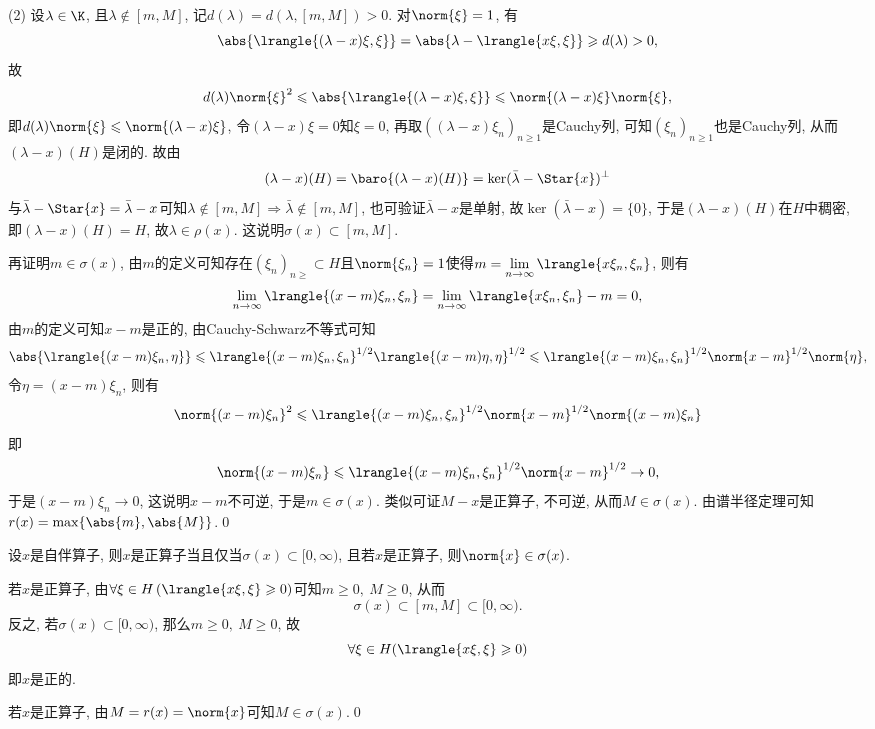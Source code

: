 \begin{Proof}
	(2) 设$ \lambda\in\K $, 且$ \lambda\notin[m,M] $, 记$ d(\lambda)=d(\lambda,[m,M])>0 $. 对$ \norm{\xi}=1 $, 有
	\[
	\abs{\lrangle{(\lambda-x)\xi,\xi}}=\abs{\lambda-\lrangle{x\xi,\xi}}\geqslant d(\lambda)>0,
	\]
	故
	\[
	d(\lambda)\norm{\xi}^2\leqslant\abs{\lrangle{(\lambda-x)\xi,\xi}}\leqslant\norm{(\lambda-x)\xi}\norm{\xi},
	\]
	即$ d(\lambda)\norm{\xi}\leqslant\norm{(\lambda-x)\xi} $, 令$ (\lambda-x)\xi=0 $知$ \xi=0 $, 再取$ ((\lambda-x)\xi_n)_{n\geqslant 1} $是Cauchy列, 可知$ (\xi_n)_{n\geqslant 1} $也是Cauchy列, 从而$ (\lambda-x)(H) $是闭的. 故由
	\[
	(\lambda-x)(H)=\baro{(\lambda-x)(H)}=\ker (\bar{\lambda}-\Star{x})^\bot
	\]
	与$ \bar{\lambda}-\Star{x}=\bar{\lambda}-x $可知$ \lambda\notin[m,M]\Rightarrow\bar{\lambda}\notin[m,M] $, 也可验证$ \bar{\lambda}-x $是单射, 故$ \ker(\bar{\lambda}-x)=\{0\} $, 于是$ (\lambda-x)(H) $在$ H $中稠密, 即$ (\lambda-x)(H)=H $, 故$ \lambda\in\rho(x) $. 这说明$ \sigma(x)\subset[m,M] $.
	
	再证明$ m\in\sigma(x) $, 由$ m $的定义可知存在$ (\xi_n)_{n\geqslant}\subset H $且$ \norm{\xi_n}=1 $使得$ m=\lim\limits_{n\to\infty}\lrangle{x\xi_n,\xi_n} $, 则有
	\[
	\lim_{n\to \infty}\lrangle{(x-m)\xi_n,\xi_n}=\lim_{n\to\infty}\lrangle{x\xi_n,\xi_n}-m=0,
	\]
	由$ m $的定义可知$ x-m $是正的, 由Cauchy-Schwarz不等式可知
	\[
	\abs{\lrangle{(x-m)\xi_n,\eta}}\leqslant\lrangle{(x-m)\xi_n,\xi_n}^{1/2}\lrangle{(x-m)\eta,\eta}^{1/2}\leqslant\lrangle{(x-m)\xi_n,\xi_n}^{1/2}\norm{x-m}^{1/2}\norm{\eta},
	\]
	令$ \eta=(x-m)\xi_n $, 则有
	\[
	\norm{(x-m)\xi_n}^2\leqslant\lrangle{(x-m)\xi_n,\xi_n}^{1/2}\norm{x-m}^{1/2}\norm{(x-m)\xi_n}
	\]
	即
	\[
	\norm{(x-m)\xi_n}\leqslant\lrangle{(x-m)\xi_n,\xi_n}^{1/2}\norm{x-m}^{1/2}\to 0,
	\]
	于是$ (x-m)\xi_n\to 0 $, 这说明$ x-m $不可逆, 于是$ m\in\sigma(x) $. 类似可证$ M-x $是正算子, 不可逆, 从而$ M\in\sigma(x) $. 由谱半径定理可知$ r(x)=\max\{ \abs{m},\abs{M} \} $.\qed
	\end{Proof}
	
	\begin{Corollary}
	设$ x $是自伴算子, 则$ x $是正算子当且仅当$ \sigma(x)\subset[0,\infty) $, 且若$ x $是正算子, 则$ \norm{x}\in\sigma(x) $.
	\end{Corollary}
	\begin{Proof}
	若$ x $是正算子, 由$ \forall \xi\in H\,(\lrangle{x\xi,\xi}\geqslant 0) $可知$ m\geqslant 0,\ M\geqslant 0 $, 从而
	\[
	\sigma(x)\subset[m,M]\subset[0,\infty).
	\]
	反之, 若$ \sigma(x)\subset[0,\infty) $, 那么$ m\geqslant 0,\ M\geqslant 0 $, 故
	\[
	\forall \xi\in H(\lrangle{x\xi,\xi}\geqslant 0)
	\]
	即$ x $是正的.
	
	若$ x $是正算子, 由$ M=r(x)=\norm{x} $可知$ M\in\sigma(x) $.\qed
	\end{Proof}
	
